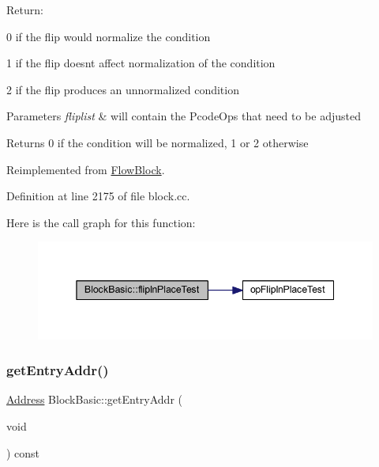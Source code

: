 Return\+:
\begin{DoxyItemize}
\item 0 if the flip would normalize the condition
\item 1 if the flip doesn\textquotesingle{}t affect normalization of the condition
\item 2 if the flip produces an unnormalized condition 
\begin{DoxyParams}{Parameters}
{\em fliplist} & will contain the Pcode\+Ops that need to be adjusted \\
\hline
\end{DoxyParams}
\begin{DoxyReturn}{Returns}
0 if the condition will be normalized, 1 or 2 otherwise 
\end{DoxyReturn}

\end{DoxyItemize}

Reimplemented from \mbox{\hyperlink{class_flow_block_a09019e2e4104844e1a698ccf72560bef}{Flow\+Block}}.



Definition at line 2175 of file block.\+cc.

Here is the call graph for this function\+:
\nopagebreak
\begin{figure}[H]
\begin{center}
\leavevmode
\includegraphics[width=345pt]{class_block_basic_a7f864c14ab60a19ffb492b86f98f29c7_cgraph}
\end{center}
\end{figure}
\mbox{\label{class_block_basic_aa77fad87efbfd970ca34b8fc71283be1}} 
\subsubsection{\texorpdfstring{getEntryAddr()}{getEntryAddr()}}
{\footnotesize\ttfamily \mbox{\hyperlink{class_address}{Address}} Block\+Basic\+::get\+Entry\+Addr (\begin{DoxyParamCaption}\item[{void}]{ }\end{DoxyParamCaption}) const}



